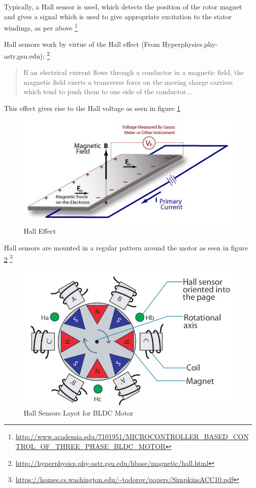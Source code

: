 \documentclass[a4paper]{article}
\begin{document}
    Typically, a Hall sensor is used, which detects the position of the rotor
    magnet and gives a signal which is used to give appropriate excitation to
    the stator windings, as per above
        \footnote{\url{http://www.academia.edu/7101951/MICROCONTROLLER_BASED_CONTROL_OF_THREE_PHASE_BLDC_MOTOR}}

    Hall sensors work by virtue of the Hall effect (From
    Hyperphysics.phy-astr.gsu.edu);
        \footnote{\url{http://hyperphysics.phy-astr.gsu.edu/hbase/magnetic/hall.html}}
    \begin{quote}
        If an electrical current flows through a conductor in a magnetic field,
        the magnetic field exerts a transverse force on the moving charge
        carriers which tend to push them to one side of the conductor...
    \end{quote}

    This effect gives rise to the Hall voltage as seen in figure \ref{HallEffect}
    \begin{figure}
        \centering
        \includegraphics[width=0.6\linewidth]{./images/HallEffect.jpg}
        \caption{\label{HallEffect}Hall Effect}
    \end{figure}

    Hall sensors are mounted in a regular pattern around the motor as seen
    in figure \ref{BLDC:Sensor:Hall}
        \footnote{\url{https://homes.cs.washington.edu/~todorov/papers/SimpkinsACC10.pdf}}

    \begin{figure}
        \centering
        \includegraphics[width=0.6\linewidth]{./images/bldcHallSensors.jpeg}
        \caption{\label{BLDC:Sensor:Hall}Hall Sensors Layot for BLDC Motor}
    \end{figure}
\end{document}
